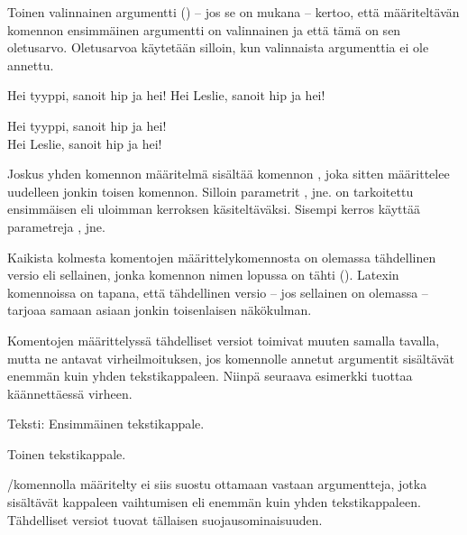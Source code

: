 Toinen valinnainen argumentti () -- jos se on mukana --
kertoo, että määriteltävän komennon ensimmäinen argumentti on
valinnainen ja että tämä on sen ole\-tus\-arvo. Ole\-tus\-arvoa
käytetään silloin, kun valinnaista argumenttia ei ole annettu.

\begin{koodilohkosis}
  \newcommand{\komento}[3][tyyppi]{Hei #1, sanoit #2 ja #3!}
  \komento{hip}{hei}
  \komento[Leslie]{hip}{hei}
\end{koodilohkosis}

\begin{tulossis}
  Hei tyyppi, sanoit hip ja hei! \\
  Hei Leslie, sanoit hip ja hei!
\end{tulossis}

Joskus yhden komennon määritelmä sisältää komennon , joka sitten määrittelee uudelleen jonkin toisen
komennon. Silloin parametrit ,  jne. on
tarkoitettu ensimmäisen eli uloimman kerroksen käsiteltäväksi. Sisempi
kerros käyttää parametreja ,  jne.

Kaikista kolmesta komentojen määrittelykomennosta on olemassa
tähdellinen versio eli sellainen, jonka komennon nimen lopussa on tähti
(\koodi{*}). Latexin komennoissa on tapana, että tähdellinen versio --
jos sellainen on olemassa -- tarjoaa samaan asiaan jonkin toisenlaisen
näkökulman.

\begin{koodilohkosis}
  \newcommand*     {\nimi}[n][oletus]{määritelmä}
  \renewcommand*   {\nimi}[n][oletus]{määritelmä}
  \providecommand* {\nimi}[n][oletus]{määritelmä}
\end{koodilohkosis}

Komentojen määrittelyssä tähdelliset versiot toimivat muuten samalla
tavalla, mutta ne antavat virheilmoituksen, jos komennolle annetut
argumentit sisältävät enemmän kuin yhden tekstikappaleen. Niinpä
seuraava esimerkki tuottaa käännettäessä virheen.

\begin{koodilohkosis}
  \newcommand*{\komento}[1]{Teksti: #1}

  \komento{
    Ensimmäinen tekstikappale.

    Toinen tekstikappale.
  }
\end{koodilohkosis}

\-/komennolla määritelty 
ei siis suostu ottamaan vastaan argumentteja, jotka sisältävät kappaleen
vaihtumisen eli enemmän kuin yhden tekstikappaleen. Tähdelliset versiot
tuovat tällaisen suo\-jaus\-omi\-nai\-suu\-den.

